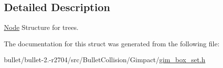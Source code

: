 \subsection{Detailed Description}
\hyperlink{struct_node}{Node} Structure for trees. 

The documentation for this struct was generated from the following file\+:\begin{DoxyCompactItemize}
\item 
bullet/bullet-\/2.-\/r2704/src/\+Bullet\+Collision/\+Gimpact/\hyperlink{gim__box__set_8h}{gim\+\_\+box\+\_\+set.\+h}\end{DoxyCompactItemize}
